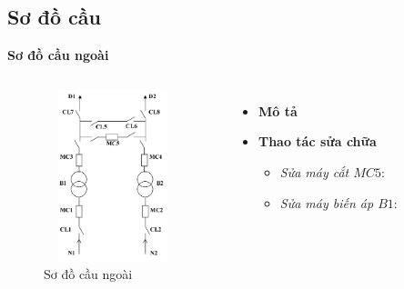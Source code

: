 \documentclass{beamer}
\begin{document}
\subsection{Sơ đồ cầu}
\begin{frame}{\textbf{Sơ đồ cầu ngoài}}
\begin{columns}
\begin{figure}[h]
\includegraphics[width=4cm, height=5cm]{sdcn}
\caption{Sơ đồ cầu ngoài}
\end{figure}

\begin{itemize}
\item \textbf{Mô tả}
\item  \textbf{Thao tác sửa chữa}
\begin{itemize}
\item<1-> \emph{Sửa máy cắt $MC5$}: 
\item<1-> \emph{Sửa máy biến áp $B1$}: 
\end{itemize}
\end{itemize}
\end{columns}
\end{frame}
\end{document}

